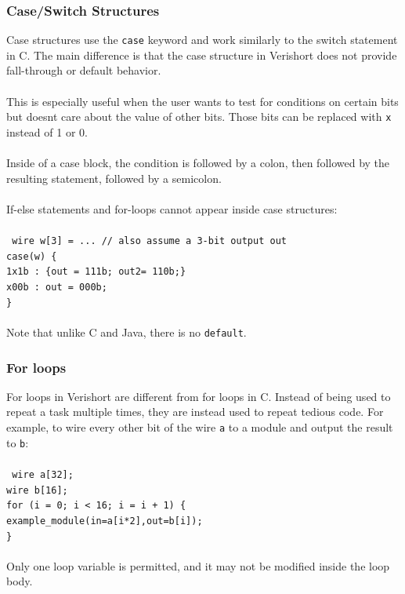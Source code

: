 \documentclass[letterpaper,11pt]{article}
\newcommand{\tab}{\hspace*{2em}}
\begin{document}
        \subsubsection{Case\slash Switch Structures}
        Case structures use the \texttt{case} keyword and work similarly to the switch statement in C.  The main 
        difference is that the case structure in Verishort does not provide fall-through or default behavior.\\\\
        This is especially useful when the user wants to test for conditions on certain bits but doesnt care 
        about the value of other bits.  Those bits can be replaced with \texttt{x} instead of 1 or 0.\\\\
        Inside of a case block, the condition is followed by a colon, then followed by the resulting statement, 
        followed by a semicolon.\\\\
        If-else statements and for-loops cannot appear inside case structures: \\\\
        \texttt{
        wire w[3] = ... \tab // also assume a 3-bit output out \\
        case(w) \{ \\
        \tab 1x1b : \{out = 111b; out2= 110b;\} \\
        \tab x00b : out = 000b; \\
        \}} \\\\ Note that unlike C and Java, there is no \texttt{default}.
        
        \subsubsection{For loops}
        For loops in Verishort are different from for loops in C.  Instead of being used to repeat a task multiple times, they are instead used to repeat tedious code.  For example, to wire every other bit of the wire \texttt{a} to a module and output the result to \texttt{b}:\\\\
\texttt{
wire a[32];\\
wire b[16];\\
for (i = 0; i < 16; i = i + 1) \{\\
	\tab example\_module(in=a[i*2],out=b[i]);\\
\} } \\\\
		Only one loop variable is permitted, and it may not be modified inside the loop body.
\end{document}
